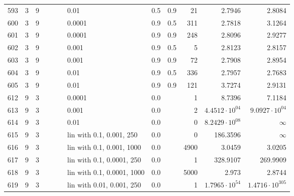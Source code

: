 \begin{longtable}{lrrrrrlrrrrr}
  593 &       3 & 9 &   &   &   &                        0.01 &      0.5 &    0.9 &      21 &                 2.7946 &                 2.8084 \\
  600 &       3 & 9 &   &   &   &                      0.0001 &      0.9 &    0.5 &     311 &                 2.7818 &                 3.1264 \\
  601 &       3 & 9 &   &   &   &                      0.0001 &      0.9 &    0.9 &     248 &                 2.8096 &                 2.9277 \\
  602 &       3 & 9 &   &   &   &                       0.001 &      0.9 &    0.5 &       5 &                 2.8123 &                 2.8157 \\
  603 &       3 & 9 &   &   &   &                       0.001 &      0.9 &    0.9 &      72 &                 2.7908 &                 2.8954 \\
  604 &       3 & 9 &   &   &   &                        0.01 &      0.9 &    0.5 &     336 &                 2.7957 &                 2.7683 \\
  605 &       3 & 9 &   &   &   &                        0.01 &      0.9 &    0.9 &     121 &                 3.7274 &                 2.9131 \\
  612 &       9 & 3 &   &   &   &                      0.0001 &      0.0 &        &       1 &                 8.7396 &                 7.1184 \\
  613 &       9 & 3 &   &   &   &                       0.001 &      0.0 &        &       2 &  $4.4512\cdot 10^{04}$ &  $9.0927\cdot 10^{04}$ \\
  614 &       9 & 3 &   &   &   &                        0.01 &      0.0 &        &       0 &  $8.2429\cdot 10^{08}$ &               $\infty$ \\
  615 &       9 & 3 &   &   &   &    lin with 0.1, 0.001, 250 &      0.0 &        &       0 &               186.3596 &               $\infty$ \\
  616 &       9 & 3 &   &   &   &   lin with 0.1, 0.001, 1000 &      0.0 &        &    4900 &                 3.0459 &                 3.0205 \\
  617 &       9 & 3 &   &   &   &   lin with 0.1, 0.0001, 250 &      0.0 &        &       1 &               328.9107 &               269.9909 \\
  618 &       9 & 3 &   &   &   &  lin with 0.1, 0.0001, 1000 &      0.0 &        &    5000 &                  2.973 &                 2.8744 \\
  619 &       9 & 3 &   &   &   &   lin with 0.01, 0.001, 250 &      0.0 &        &       1 &  $1.7965\cdot 10^{54}$ & $1.4716\cdot 10^{305}$ \\

\end{longtable}
